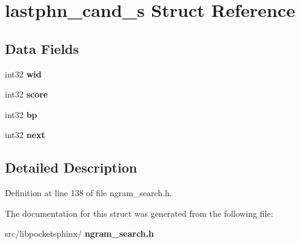 \section{lastphn\+\_\+cand\+\_\+s Struct Reference}
\label{structlastphn__cand__s}
\subsection*{Data Fields}
\begin{DoxyCompactItemize}
\item 
\mbox{\label{structlastphn__cand__s_af8f9fa3e4b6b7e2295d7a437b6f754c3}} 
int32 {\bfseries wid}
\item 
\mbox{\label{structlastphn__cand__s_af862094c7b2476c6a66dbc120b19775b}} 
int32 {\bfseries score}
\item 
\mbox{\label{structlastphn__cand__s_aa1aeb014f9023a75c81813376115fbcc}} 
int32 {\bfseries bp}
\item 
\mbox{\label{structlastphn__cand__s_a06dade75d757f45e5d43b4869d85bac9}} 
int32 {\bfseries next}
\end{DoxyCompactItemize}


\subsection{Detailed Description}


Definition at line 138 of file ngram\+\_\+search.\+h.



The documentation for this struct was generated from the following file\+:\begin{DoxyCompactItemize}
\item 
src/libpocketsphinx/\textbf{ ngram\+\_\+search.\+h}\end{DoxyCompactItemize}
